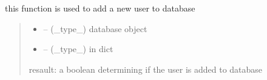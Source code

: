 \documentclass[letterpaper,10pt,english]{sphinxmanual}
\begin{document}
\begin{savenotes}\begin{fulllineitems}
\label{\detokenize{setting/backend/user_management_funcs:oxin.backend.user_management_funcs.add_new_user_to_db}}
\pysigstartsignatures
{}
\pysigstopsignatures
\sphinxAtStartPar
this function is used to add a new user to database
\begin{quote}\begin{description}
\begin{itemize}
\item {} 
\sphinxAtStartPar
{} – (\_type\_) database object

\item {} 
\sphinxAtStartPar
{} – (\_type\_) in dict

\end{itemize}

\sphinxAtStartPar
resault: a boolean determining if the user is added to database

\end{description}\end{quote}

\end{fulllineitems}\end{savenotes}

\end{document}
